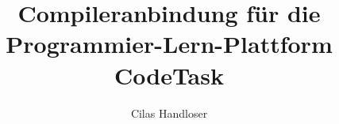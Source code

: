 \documentclass[german]{htwg-report}
\begin{document}
\frontmatter



\title[Compileranbindung für die Programmier-Lern-Plattform CodeTask]{Compileranbindung für die Programmier-Lern-Plattform CodeTask}

\author{Cilas Handloser}


\makecover[]

%          




\tableofcontents






\mainmatter









\appendix

%

\printbibliography[heading=bibintoc]
\end{document}
